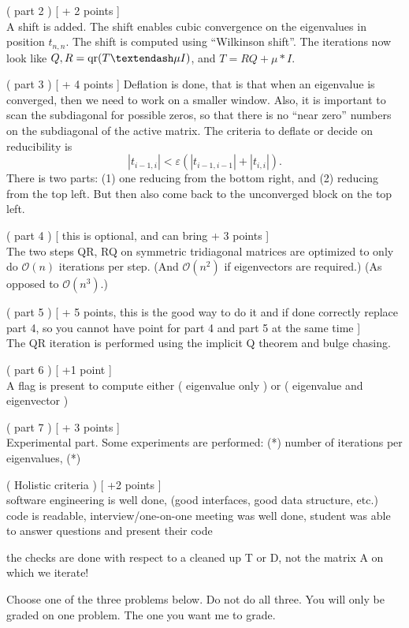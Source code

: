 \documentclass[11pt,letterpaper]{article}
\begin{document}
( part 2 ) [ + 2 points ] \\
A shift is added. The shift enables cubic convergence on the eigenvalues in
position $t_{n,n}$. The shift is computed using ``Wilkinson shift''. The
iterations now look like $Q, R  = \textmd{qr} ( T – \mu I )$, and $T = RQ + \mu * I$. 

( part 3 ) [ + 4 points ] Deflation is done, that is that when an eigenvalue is
converged, then we need to work on a smaller window. Also, it is important to
scan the subdiagonal for possible zeros, so that there is no ``near zero''
numbers on the subdiagonal of the active matrix. The criteria to deflate or
decide on reducibility is 
$$| t_{i-1,i} | < \varepsilon ( | t_{i-1,i-1} | + | t_{i,i} | ).$$
There is two parts: (1) one reducing from the bottom right, and (2) reducing from the top left.
But then also come back to the unconverged block on the top left.

( part 4 ) [ this is optional, and can bring + 3 points ] \\
The two steps QR, RQ on symmetric tridiagonal matrices are optimized to only do
$\mathcal{O}(n)$ iterations per step. (And $\mathcal{O}(n^2)$  if eigenvectors are
required.) (As opposed to $\mathcal{O}(n^3)$.)

( part 5 ) [ + 5 points, this is the good way to do it and if done correctly
replace part 4, so you cannot have point for part 4 and part 5 at the same time
] \\
The QR iteration is performed using the implicit Q theorem and bulge chasing.

( part 6 ) [ +1 point ] \\
A flag is present to compute either ( eigenvalue only ) or ( eigenvalue and eigenvector )

( part 7 ) [ + 3 points ] \\
Experimental part. Some experiments are performed: (*) number of iterations per
eigenvalues, (*) 

( Holistic criteria ) [ +2 points ] \\
software engineering is well done, (good interfaces, good data structure, etc.)
code is readable, interview/one-on-one meeting was well done, student was able
to answer questions and present their code


the checks are done with respect to a cleaned up T or D, not the matrix A on which we iterate!




Choose one of the three problems below. Do not do all three. You will only be
graded on one problem. The one you want me to grade.
\end{document}

